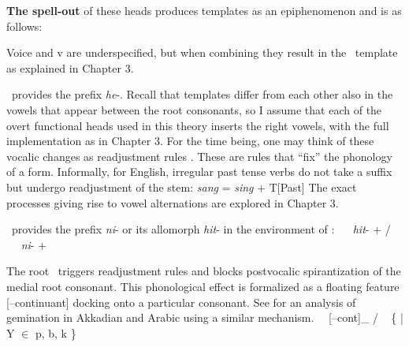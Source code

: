 \textbf{The spell-out} of these heads produces templates as an epiphenomenon and is as follows: 

Voice and v are underspecified, but when combining they result in the \tkal~template as explained in Chapter 3.

\vd~provides the prefix \emph{he}-. Recall that templates differ from each other also in the vowels that appear between the root consonants, so I assume that each of the overt functional heads used in this theory inserts the right vowels, with the full implementation as in Chapter 3. For the time being, one may think of these vocalic changes as readjustment rules \citep{embickhalle05}. These are rules that ``fix'' the phonology of a form. Informally, for English, irregular past tense verbs do not take a suffix but undergo readjustment of the stem:
\ex \emph{sang} = \emph{sing} + T[Past]
\xe
The exact processes giving rise to vowel alternations are explored in Chapter 3.

\vz~provides the prefix \emph{ni}- or its allomorph \emph{hit}- in the environment of \va:
\pex
\a \vz~\lra~ \emph{hit}- +  / \trace~\va
\a \vz~\lra~ \emph{ni}- + 
\xe

The root \va~triggers readjustment rules and blocks postvocalic spirantization of the medial root consonant. This phonological effect is formalized as a floating feature [--continuant] docking onto a particular consonant. See \cite{katie13} for an analysis of gemination in Akkadian and Arabic using a similar mechanism.
\ex \va~\lra~[--cont]_{} / \trace~ \{  | Y $\in$ p, b, k \}
\xe


